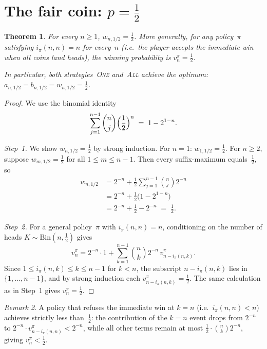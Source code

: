 \documentclass[12pt]{article}
\newtheorem{theorem}{Theorem}[section]
\theoremstyle{definition}
\theoremstyle{remark}
\newtheorem{remark}[theorem]{Remark}
\newcommand{\One}{\textsc{One}}
\newcommand{\All}{\textsc{All}}
\begin{document}
\section{The fair coin: \texorpdfstring{$p=\tfrac12$}{p = 1/2}}
\label{sec:fair}

\begin{theorem}\label{thm:half}
  For every $n\ge 1$, $w_{n,1/2}=\tfrac12$.  More generally, for any
  policy~$\pi$ satisfying $i_\pi(n,n)=n$ for every~$n$ (i.e.\ the
  player accepts the immediate win when all coins land heads), the
  winning probability is $v_n^\pi=\tfrac12$.

  In particular, both strategies~\One{} and~\All{} achieve the
  optimum: $a_{n,1/2}=b_{n,1/2}=w_{n,1/2}=\tfrac12$.
\end{theorem}

\begin{proof}
  We use the binomial identity
  \begin{equation}\label{eq:bin-half}
    \sum_{j=1}^{n-1}\binom{n}{j}\Bigl(\frac{1}{2}\Bigr)^{n}
    \;=\; 1-2^{1-n}.
  \end{equation}

  \emph{Step~1.}  We show $w_{n,1/2}=\tfrac12$ by strong induction.
  For $n=1$: $w_{1,1/2}=\tfrac12$.  For $n\ge 2$, suppose
  $w_{m,1/2}=\tfrac12$ for all $1\le m\le n-1$.  Then every
  suffix-maximum equals~$\tfrac12$, so
  \begin{align*}
    w_{n,1/2}
    &= 2^{-n} + \frac{1}{2}\sum_{j=1}^{n-1}\binom{n}{j}2^{-n} \\
    &= 2^{-n} + \tfrac{1}{2}\bigl(1-2^{1-n}\bigr) \\
    &= 2^{-n} + \tfrac{1}{2} - 2^{-n}
    \;=\; \tfrac{1}{2}.
  \end{align*}

  \emph{Step~2.}  For a general policy~$\pi$ with
  $i_\pi(n,n)=n$, conditioning on the number of heads
  $K\sim\mathrm{Bin}(n,\tfrac12)$ gives
  \[
    v_n^\pi = 2^{-n}\cdot 1 + \sum_{k=1}^{n-1}\binom{n}{k}2^{-n}\,
    v_{n-i_\pi(n,k)}^\pi.
  \]
  Since $1\le i_\pi(n,k)\le k\le n-1$ for $k<n$, the subscript
  $n-i_\pi(n,k)$ lies in $\{1,\dots,n-1\}$, and by strong induction
  each $v_{n-i_\pi(n,k)}^\pi=\tfrac12$.  The same calculation as in
  Step~1 gives $v_n^\pi=\tfrac12$.
\end{proof}

\begin{remark}\label{rem:refuse}
  A policy that refuses the immediate win at $k=n$ (i.e.\
  $i_\pi(n,n)<n$) achieves strictly less than~$\tfrac12$: the
  contribution of the $k=n$ event drops from $2^{-n}$ to
  $2^{-n}\cdot v_{n-i_\pi(n,n)}^\pi < 2^{-n}$, while all other terms
  remain at most $\tfrac12\cdot\binom{n}{k}2^{-n}$, giving
  $v_n^\pi<\tfrac12$.
\end{remark}
\end{document}
